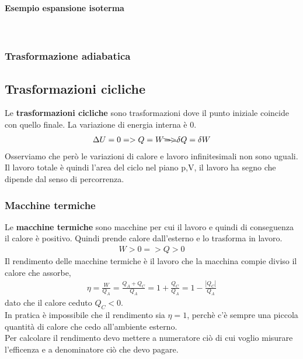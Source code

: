                 \paragraph{Esempio espansione isoterma}
                \quad\\

            \subsubsection{Trasformazione adiabatica}

        \subsection{Trasformazioni cicliche}
            Le \textbf{trasformazioni cicliche} sono trasformazioni dove il punto iniziale coincide con quello finale. La variazione di energia interna è 0.
            \begin{align*}
                \Delta U = 0 => Q = W \bcancel{=>}\delta Q = \delta W
            \end{align*}
            Osserviamo che però le variazioni di calore e lavoro infinitesimali non sono uguali.\\
            Il lavoro totale è quindi l'area del ciclo nel piano p,V, il lavoro ha segno che dipende dal senso di percorrenza.

            \subsubsection{Macchine termiche}
                Le \textbf{macchine termiche} sono macchine per cui il lavoro e quindi di conseguenza il calore è positivo. Quindi prende calore dall'esterno e lo trasforma in lavoro.
                \begin{align*}
                    W > 0 => Q > 0
                \end{align*}
                Il rendimento delle macchine termiche è il lavoro che la macchina compie diviso il calore che assorbe,
                \begin{align*}
                    \eta = \frac{W}{Q_A} = \frac{Q_A + Q_C}{Q_A} = 1 + \frac{Q_C}{Q_A} = 1 - \frac{|Q_C|}{Q_A}
                \end{align*}
                dato che il calore ceduto $Q_C < 0$.\\
                In pratica è impossibile che il rendimento sia $\eta=1$, perchè c'è sempre una piccola quantità di calore che cedo all'ambiente esterno.\\
                Per calcolare il rendimento devo mettere a numeratore ciò di cui voglio misurare l'efficenza e a denominatore ciò che devo pagare.

